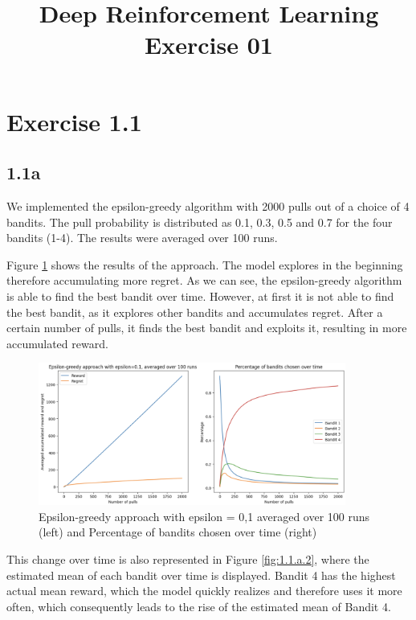 \documentclass{article} %
\begin{document}
	
	\title{Deep Reinforcement Learning Exercise 01}
	\maketitle
	
	\section{Exercise 1.1}
	\subsection{1.1a}
	
	We implemented the epsilon-greedy algorithm with 2000 pulls out of a choice of 4 bandits. The pull probability is distributed as 0.1, 0.3, 0.5 and 0.7 for the four bandits (1-4). The results were averaged over 100 runs. 
	
	Figure \ref{fig:1.1.a.1} shows the results of the approach. The model explores in the beginning therefore accumulating more regret. As we can see, the epsilon-greedy algorithm is able to find the best bandit over time. However, at first it is not able to find the best bandit, as it explores other bandits and accumulates regret. After a certain number of pulls, it finds the best bandit and exploits it, resulting in more accumulated reward. 
	
	\begin{figure}[h!]
		\centering
		\includegraphics[width=0.9\textwidth]{images/1.1.a.1}
		\caption{Epsilon-greedy approach with epsilon = 0,1 averaged over 100 runs (left) and Percentage of bandits chosen over time (right)}
		\label{fig:1.1.a.1}
	\end{figure}
	
	This change over time is also represented in Figure \ref{fig:1.1.a.2}, where the estimated mean of each bandit over time is displayed. Bandit 4 has the highest actual mean reward, which the model quickly realizes and therefore uses it more often, which consequently leads to the rise of the estimated mean of Bandit 4. 
	
\end{document}
